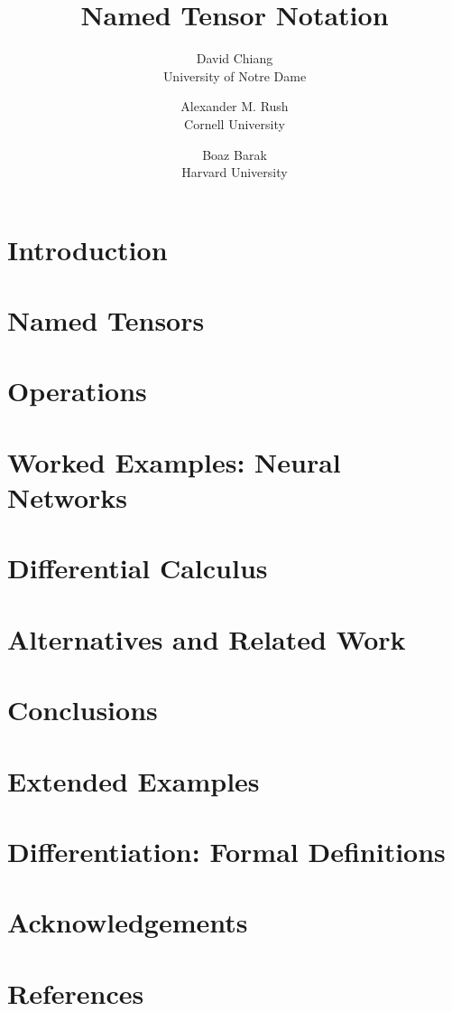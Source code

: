 \documentclass[10pt]{article}
\title{Named Tensor Notation}
\author{David Chiang \\ University of Notre Dame \and Alexander M. Rush \\ Cornell University \and Boaz Barak \\ Harvard University}
\renewcommand{\/}{}
\begin{document}
\maketitle

\section{Introduction}
\label{sec:intro}


\section{Named Tensors}


\section{Operations}
\label{sec:operations}


\section{Worked Examples: Neural Networks}
\label{sec:examples}


\section{Differential Calculus}
\label{sec:calculus}


\section{Alternatives and Related Work}


\section{Conclusions}


\appendix

\section{Extended Examples}
\label{sec:examples_long}


\section{Differentiation: Formal Definitions}
\label{sec:calculus_formal}




\section*{Acknowledgements}


\section*{References}
\end{document}
